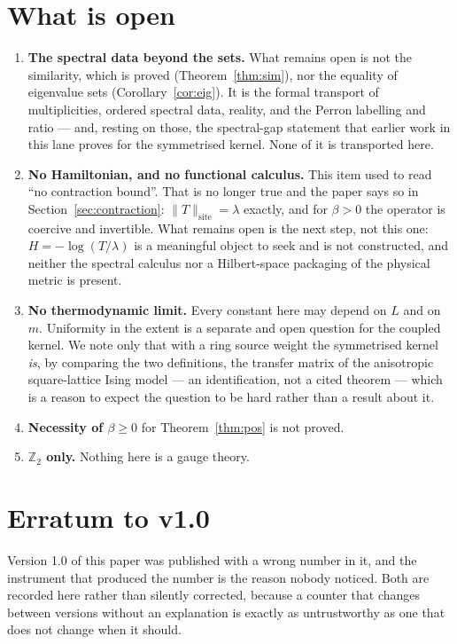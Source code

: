 \documentclass[11pt]{article}
\theoremstyle{definition}
\newcommand{\Z}{\mathbb{Z}}
\begin{document}
\section{What is open}\label{sec:open}

\begin{enumerate}
\item \textbf{The spectral data beyond the sets.}  What remains open is not the
similarity, which is proved (Theorem~\ref{thm:sim}), nor the equality of
eigenvalue sets (Corollary~\ref{cor:eig}).  It is the formal transport of
multiplicities, ordered spectral data, reality, and the Perron labelling and
ratio --- and, resting on those, the spectral-gap statement that earlier work in
this lane proves for the symmetrised kernel.  None of it is transported here.
\item \textbf{No Hamiltonian, and no functional calculus.}  This item used to
read ``no contraction bound''.  That is no longer true and the paper says so in
Section~\ref{sec:contraction}: $\|T\|_{\mathrm{site}}=\lambda$ exactly, and for
$\beta>0$ the operator is coercive and invertible.  What remains open is the
next step, not this one: $H=-\log(T/\lambda)$ is a meaningful object to seek and
is not constructed, and neither the spectral calculus nor a Hilbert-space
packaging of the physical metric is present.
\item \textbf{No thermodynamic limit.}  Every constant here may depend on $L$
and on $m$.  Uniformity in the extent is a separate and open question for the
coupled kernel.  We note only that with a ring source weight the symmetrised
kernel \emph{is}, by comparing the two definitions, the transfer matrix of the
anisotropic square-lattice Ising model --- an identification, not a cited
theorem --- which is a reason to expect the question to be hard rather than a
result about it.
\item \textbf{Necessity of $\beta\ge0$} for Theorem~\ref{thm:pos} is not proved.
\item \textbf{$\Z_2$ only.}  Nothing here is a gauge theory.
\end{enumerate}

\section{Erratum to v1.0}\label{sec:erratum}

Version 1.0 of this paper was published with a wrong number in it, and the
instrument that produced the number is the reason nobody noticed.  Both are
recorded here rather than silently corrected, because a counter that changes
between versions without an explanation is exactly as untrustworthy as one that
does not change when it should.
\end{document}
